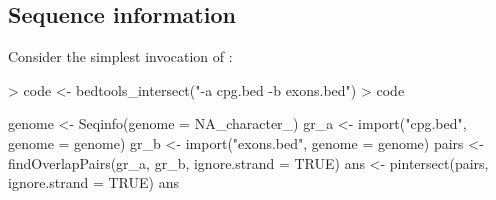 \documentclass[10pt]{article}
\begin{document}
\subsection{Sequence information}

Consider the simplest invocation of :
\begin{Schunk}
\begin{Sinput}
> code <- bedtools_intersect("-a cpg.bed -b exons.bed")
> code
\end{Sinput}
\begin{Soutput}
{
    genome <- Seqinfo(genome = NA_character_)
    gr_a <- import("cpg.bed", genome = genome)
    gr_b <- import("exons.bed", genome = genome)
    pairs <- findOverlapPairs(gr_a, gr_b, ignore.strand = TRUE)
    ans <- pintersect(pairs, ignore.strand = TRUE)
    ans
}
\end{Soutput}
\end{Schunk}
\end{document}
